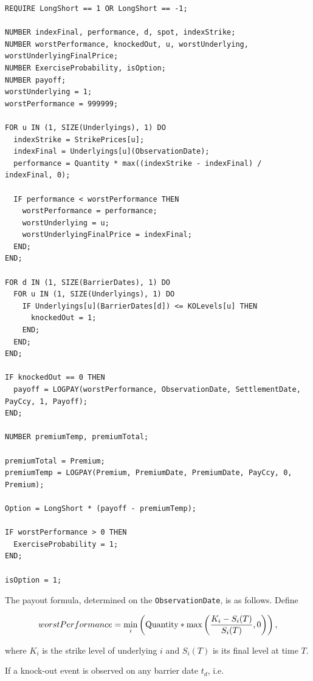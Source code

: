 \begin{listing}[hbt]
\begin{verbatim}
REQUIRE LongShort == 1 OR LongShort == -1;

NUMBER indexFinal, performance, d, spot, indexStrike;
NUMBER worstPerformance, knockedOut, u, worstUnderlying, worstUnderlyingFinalPrice;
NUMBER ExerciseProbability, isOption;
NUMBER payoff;
worstUnderlying = 1;
worstPerformance = 999999;

FOR u IN (1, SIZE(Underlyings), 1) DO
  indexStrike = StrikePrices[u];
  indexFinal = Underlyings[u](ObservationDate);
  performance = Quantity * max((indexStrike - indexFinal) / indexFinal, 0);

  IF performance < worstPerformance THEN
    worstPerformance = performance;
    worstUnderlying = u;
    worstUnderlyingFinalPrice = indexFinal;
  END;
END;

FOR d IN (1, SIZE(BarrierDates), 1) DO
  FOR u IN (1, SIZE(Underlyings), 1) DO
    IF Underlyings[u](BarrierDates[d]) <= KOLevels[u] THEN
      knockedOut = 1;
    END;
  END;
END;

IF knockedOut == 0 THEN
  payoff = LOGPAY(worstPerformance, ObservationDate, SettlementDate, PayCcy, 1, Payoff);
END;

NUMBER premiumTemp, premiumTotal;

premiumTotal = Premium;
premiumTemp = LOGPAY(Premium, PremiumDate, PremiumDate, PayCcy, 0, Premium);

Option = LongShort * (payoff - premiumTemp);

IF worstPerformance > 0 THEN
  ExerciseProbability = 1;
END;

isOption = 1;
\end{verbatim}
\caption{Payoff script for a WorstPerformanceRainbowOption09.}
\label{lst:worst_performance_rainbow_option_09}
\end{listing}

The payout formula, determined on the \lstinline!ObservationDate!, is as follows.
Define

\begin{equation*}
  worstPerformance = \min_i \left( \text{\lstinline!Quantity!} * \max\left(\frac{K_i - S_i(T)}{S_i(T)}, 0\right) \right),
\end{equation*}

where $K_i$ is the strike level of underlying $i$ and $S_i(T)$ is its final level at time $T$.

If a knock-out event is observed on any barrier date $t_d$, i.e.

